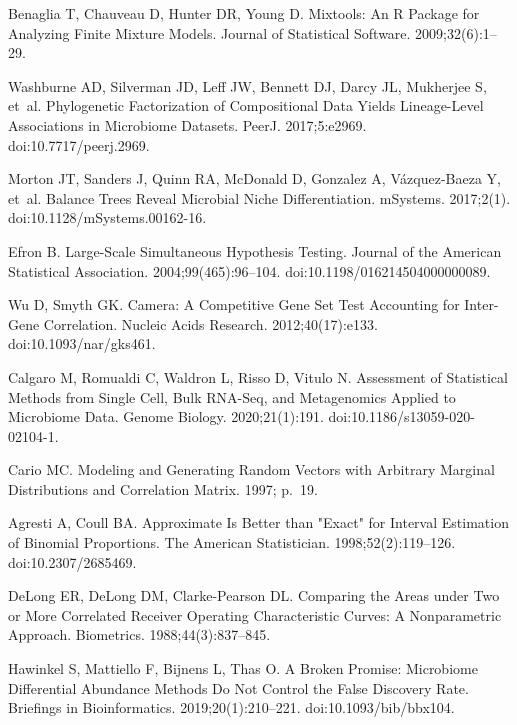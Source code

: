 \documentclass[10pt,letterpaper]{article}
\begin{document}
\begin{thebibliography}{10}
Benaglia T, Chauveau D, Hunter DR, Young D.
\newblock Mixtools: {{An R}} Package for Analyzing Finite Mixture Models.
\newblock Journal of Statistical Software. 2009;32(6):1--29.

Washburne AD, Silverman JD, Leff JW, Bennett DJ, Darcy JL, Mukherjee S, et~al.
\newblock Phylogenetic Factorization of Compositional Data Yields Lineage-Level
  Associations in Microbiome Datasets.
\newblock PeerJ. 2017;5:e2969.
\newblock doi:{10.7717/peerj.2969}.

Morton JT, Sanders J, Quinn RA, McDonald D, Gonzalez A, {V{\'a}zquez-Baeza} Y,
  et~al.
\newblock Balance {{Trees Reveal Microbial Niche Differentiation}}.
\newblock mSystems. 2017;2(1).
\newblock doi:{10.1128/mSystems.00162-16}.

Efron B.
\newblock Large-{{Scale Simultaneous Hypothesis Testing}}.
\newblock Journal of the American Statistical Association.
  2004;99(465):96--104.
\newblock doi:{10.1198/016214504000000089}.

Wu D, Smyth GK.
\newblock Camera: A Competitive Gene Set Test Accounting for Inter-Gene
  Correlation.
\newblock Nucleic Acids Research. 2012;40(17):e133.
\newblock doi:{10.1093/nar/gks461}.

Calgaro M, Romualdi C, Waldron L, Risso D, Vitulo N.
\newblock Assessment of Statistical Methods from Single Cell, Bulk {{RNA}}-Seq,
  and Metagenomics Applied to Microbiome Data.
\newblock Genome Biology. 2020;21(1):191.
\newblock doi:{10.1186/s13059-020-02104-1}.

Cario MC.
\newblock Modeling and {{Generating Random Vectors}} with {{Arbitrary Marginal
  Distributions}} and {{Correlation Matrix}}. 1997; p.~19.

Agresti A, Coull BA.
\newblock Approximate {{Is Better}} than "{{Exact}}" for {{Interval
  Estimation}} of {{Binomial Proportions}}.
\newblock The American Statistician. 1998;52(2):119--126.
\newblock doi:{10.2307/2685469}.

DeLong ER, DeLong DM, {Clarke-Pearson} DL.
\newblock Comparing the Areas under Two or More Correlated Receiver Operating
  Characteristic Curves: A Nonparametric Approach.
\newblock Biometrics. 1988;44(3):837--845.

Hawinkel S, Mattiello F, Bijnens L, Thas O.
\newblock A Broken Promise: Microbiome Differential Abundance Methods Do Not
  Control the False Discovery Rate.
\newblock Briefings in Bioinformatics. 2019;20(1):210--221.
\newblock doi:{10.1093/bib/bbx104}.


\end{thebibliography}
\end{document}
